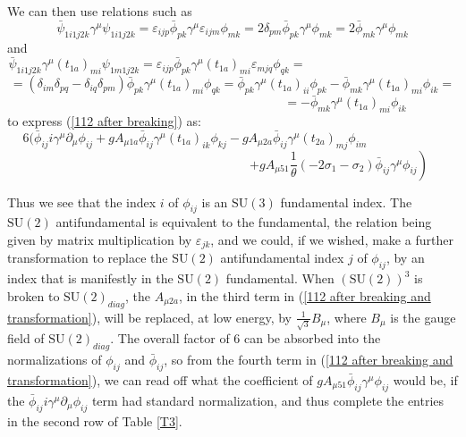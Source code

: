 \documentclass[a4paper,12pt,oneside]{article}
\begin{document}
We can then use relations such as
\begin{equation}\label{112 without inserted SU3 t}
\bar{\psi}_{1i1j2k}\gamma^\mu\psi_{1i1j2k}
=\varepsilon_{ijp}\bar{\phi}_{pk}\gamma^\mu
\varepsilon_{ijm}\phi_{mk}
=2\delta_{pm}\bar{\phi}_{pk}\gamma^\mu\phi_{mk}
=2\bar{\phi}_{mk}\gamma^\mu\phi_{mk}
\end{equation}
and
\begin{displaymath}
\bar{\psi}_{1i1j2k}\gamma^\mu\left(t_{1a}\right)_{mi}\psi_{1m1j2k}
=\varepsilon_{ijp}\bar{\phi}_{pk}\gamma^\mu\left(t_{1a}\right)_{mi}
\varepsilon_{mjq}\phi_{qk}=\qquad\qquad\qquad\qquad\qquad\qquad
\end{displaymath}
\begin{displaymath}
=\left(\delta_{im}\delta_{pq}-\delta_{iq}
\delta_{pm}\right)\bar{\phi}_{pk}\gamma^\mu\left(t_{1a}\right)_{mi}
\phi_{qk}=
\bar{\phi}_{pk}\gamma^\mu\left(t_{1a}\right)_{ii}\phi_{pk}-
\bar{\phi}_{mk}\gamma^\mu\left(t_{1a}\right)_{mi}\phi_{ik}=
\end{displaymath}
\begin{equation}\label{112 with inserted SU3 t}
\qquad\qquad\qquad\qquad\qquad\qquad\qquad\qquad\qquad
=-\bar{\phi}_{mk}\gamma^\mu\left(t_{1a}\right)_{mi}\phi_{ik}
\end{equation}
to express (\ref{112 after breaking}) as:
\begin{displaymath}
6\bigg(\bar{\phi}_{ij}i\gamma^\mu\partial_\mu\phi_{ij}
+ g A_{\mu 1a}
\bar{\phi}_{ij}\gamma^\mu\left(t_{1a}\right)_{ik}\phi_{kj}
- g A_{\mu 2a}\bar{\phi}_{ij}\gamma^\mu\! 
\left(t_{2a}\right)_{mj}\phi_{im}\qquad\qquad\qquad
\end{displaymath}
\begin{equation}\label{112 after breaking and transformation}
\qquad\qquad\qquad\qquad\qquad\qquad\qquad\qquad
\qquad\left.+ g A_{\mu 51} \frac{1}{\theta}\left( - 2 \sigma_1
- \sigma_2\right)\bar{\phi}_{ij}\gamma^\mu\phi_{ij}\right)\quad
\end{equation}

Thus we see that the index $i$ of $\phi_{ij}$ is an $\mathrm{SU}(3)$
fundamental index.  The $\mathrm{SU}(2)$ antifundamental is 
equivalent to the fundamental, the relation being given by matrix
multiplication by $\varepsilon_{jk}$, and we could, if we wished,
make a further transformation to replace the $\mathrm{SU}(2)$
antifundamental index $j$ of $\phi_{ij}$, by an index that is 
manifestly in the $\mathrm{SU}(2)$ fundamental.  When $(\mathrm{SU}
(2))^3$ is broken to $\mathrm{SU}(2)_{diag}$, the $A_{\mu2a}$, in
the third term in (\ref{112 after breaking and transformation}), 
will be replaced, at low energy, by $\frac{1}{\sqrt{3}}B_\mu$, where
$B_\mu$ is the gauge field of $\mathrm{SU}(2)_{diag}$.  The overall
factor of 6 can be absorbed into the normalizations of $\phi_{ij}$
and $\bar{\phi}_{ij}$, so from the fourth term in
(\ref{112 after breaking and transformation}), we can read off what 
the coefficient of $g A_{\mu 51}\bar{\phi}_{ij}\gamma^\mu\phi_{ij}$ 
would be, if the 
$\bar{\phi}_{ij}i\gamma^\mu\partial_\mu\phi_{ij}$ term had standard
normalization, and thus complete the entries in the second row of
Table \ref{T3}.
\end{document}
